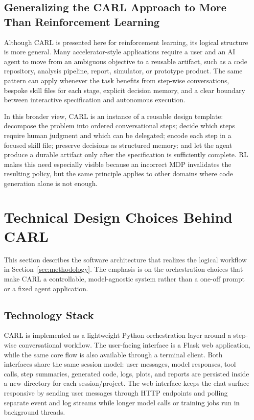 \documentclass[mnsc,sglanonrev]{informs4}
\begin{document}
\subsection{Generalizing the CARL Approach to More Than Reinforcement Learning}
\label{GenCARL}

Although CARL is presented here for reinforcement learning, its logical structure is more general. Many accelerator-style applications require a user and an AI agent to move from an ambiguous objective to a reusable artifact, such as a code repository, analysis pipeline, report, simulator, or prototype product. The same pattern can apply whenever the task benefits from step-wise conversations, bespoke skill files for each stage, explicit decision memory, and a clear boundary between interactive specification and autonomous execution.

In this broader view, CARL is an instance of a reusable design template: decompose the problem into ordered conversational steps; decide which steps require human judgment and which can be delegated; encode each step in a focused skill file; preserve decisions as structured memory; and let the agent produce a durable artifact only after the specification is sufficiently complete. RL makes this need especially visible because an incorrect MDP invalidates the resulting policy, but the same principle applies to other domains where code generation alone is not enough.




\section{Technical Design Choices Behind CARL}
\label{sec:architecture}

This section describes the software architecture that realizes the logical workflow in Section~\ref{sec:methodology}. The emphasis is on the orchestration choices that make CARL a controllable, model-agnostic system rather than a one-off prompt or a fixed agent application.

\subsection{Technology Stack}

CARL is implemented as a lightweight Python orchestration layer around a step-wise conversational workflow. The user-facing interface is a Flask web application, while the same core flow is also available through a terminal client. Both interfaces share the same session model: user messages, model responses, tool calls, step summaries, generated code, logs, plots, and reports are persisted inside a new directory for each session/project. The web interface keeps the chat surface responsive by sending user messages through HTTP endpoints and polling separate event and log streams while longer model calls or training jobs run in background threads.
\end{document}
